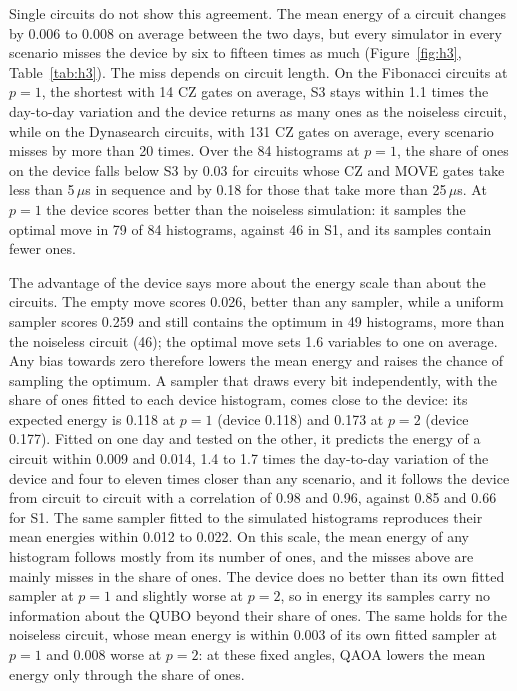 \documentclass{scspaperproc}
\begin{document}
Single circuits do not show this agreement. The mean energy of a circuit
changes by 0.006 to 0.008 on average between the two days, but every
simulator in every scenario misses the device by six to fifteen times as much
(Figure~\ref{fig:h3}, Table~\ref{tab:h3}). The miss depends on circuit
length. On the Fibonacci circuits at $p = 1$, the shortest with 14 CZ gates on average,
S3 stays within 1.1 times the day-to-day variation and the device returns as
many ones as the noiseless circuit, while on the Dynasearch circuits, with
131 CZ gates on average, every scenario misses by more than 20 times. Over the 84
histograms at $p = 1$, the share of ones on the device falls below S3 by 0.03
for circuits whose CZ and MOVE gates take less than 5\,$\mu$s in sequence
and by 0.18 for those that take more than 25\,$\mu$s. At $p = 1$ the device scores better
than the noiseless simulation: it samples the optimal move in 79 of 84
histograms, against 46 in S1, and its samples contain fewer ones.

The advantage of the device says more about the energy scale than about
the circuits. The empty move scores 0.026,
better than any sampler, while a uniform sampler scores 0.259 and still
contains the optimum in 49 histograms, more than the noiseless circuit (46); the optimal move sets 1.6 variables to
one on average. Any bias towards zero therefore lowers the mean energy and
raises the chance of sampling the optimum. A sampler that draws every bit
independently, with the share of ones fitted to each device histogram, comes
close to the device: its expected energy is 0.118 at $p = 1$ (device 0.118)
and 0.173 at $p = 2$ (device 0.177). Fitted on one day and tested on the
other, it predicts the energy of a circuit within 0.009 and 0.014, 1.4 to 1.7
times the day-to-day variation of the device and four to eleven times closer
than any scenario, and it follows the device from circuit to circuit with a
correlation of 0.98 and 0.96, against 0.85 and 0.66 for S1. The same sampler fitted to the simulated histograms reproduces their mean
energies within 0.012 to 0.022. On this scale, the mean energy of any
histogram follows mostly from its number of ones, and the misses above are
mainly misses in the share of ones. The device does no better than its own
fitted sampler at $p = 1$ and slightly worse at $p = 2$, so in energy its
samples carry no information about the QUBO beyond their share of ones. The
same holds for the noiseless circuit, whose mean energy is within 0.003 of its
own fitted sampler at $p = 1$ and 0.008 worse at $p = 2$: at these fixed angles, QAOA lowers the mean energy only through the share of ones.
\end{document}
